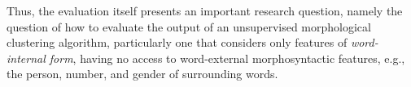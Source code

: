 Thus, the evaluation itself presents an important research question, namely the question of how to evaluate the output of an unsupervised morphological clustering algorithm, particularly one that considers only features of \emph{word-internal form}, having no access to word-external morphosyntactic features, e.g., the person, number, and gender of  surrounding words.

%
